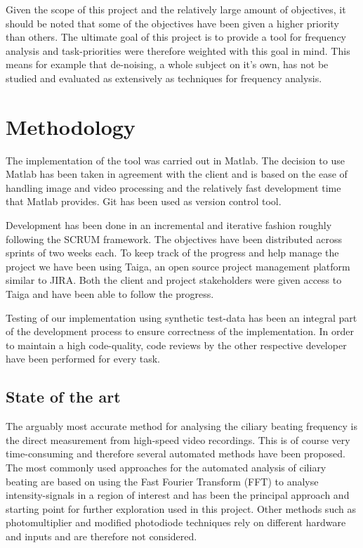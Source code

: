 \documentclass[11pt]{scrartcl}
\begin{document}
Given the scope of this project and the relatively large amount of objectives, it should be noted that some of
the objectives have been given a higher priority than others. The ultimate goal of this project is to provide
a tool for frequency analysis and task-priorities were therefore weighted with this goal in mind. This
means for example that de-noising, a whole subject on it's own, has not be studied and evaluated as
extensively as techniques for frequency analysis.

 

\section{Methodology}

The implementation of the tool was carried out in Matlab. The decision to use Matlab has been taken in
agreement with the client and is based on the ease of handling image and video processing and the relatively
fast development time that Matlab provides.  Git has been used as version control tool.

Development has been done in an incremental and iterative fashion roughly following the SCRUM framework. The
objectives have been distributed across sprints of two weeks each. To keep track
of the progress and help manage the project we have been using Taiga, an open source project management
platform similar to JIRA. Both the client and project stakeholders were given access to Taiga and have been able
to follow the progress.

Testing of our implementation using synthetic test-data has been an integral part of
the development process to ensure correctness of the implementation. In order to maintain a high code-quality, code reviews by the other respective
developer have been performed for every task.

\subsection{State of the art}

The arguably most accurate method for analysing the ciliary beating frequency is the direct measurement from
high-speed video recordings. This is of course very time-consuming and therefore several automated methods
have been proposed. The most commonly used approaches for the automated analysis of ciliary beating are based
on using the Fast Fourier Transform (FFT) to analyse intensity-signals in a region of interest and has been the
principal approach and starting point for further exploration used in this project. Other methods such as
photomultiplier and modified photodiode techniques rely on different hardware and inputs and are therefore not
considered.
\end{document}
